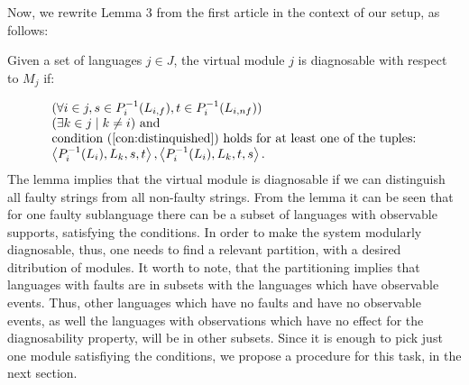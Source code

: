 \documentclass[a4paper, 10pt, conference]{ieeeconf}
\begin{document}
Now, we rewrite Lemma 3 from the first article in the context of our setup, as
follows:
\begin{lemma}
Given a set of languages $j \in J$, the virtual module $j$ is diagnosable with
respect to $M_j$ if:
\end{lemma}
\begin{equation}
	\begin{array}{l}
		(\forall i \in j, 
			s \in P_i^{-1}(L_{i,f}), 
			t \in P_i^{-1}(L_{i,nf}))
		\\
		(\exists k \in j \mid k \neq i) \textrm{ and }
		\\
		\textrm{condition (\ref{con:distinquished}) holds for at least one of
		the tuples:}
		\\
		\left<P_i^{-1}(L_i), L_k, s, t \right>,
		\left<P_i^{-1}(L_i), L_k, t, s \right>.
	\end{array}
\end{equation}
The lemma implies that the virtual module is diagnosable if we can distinguish
all faulty strings from all non-faulty strings. 
From the lemma it can be seen that for one faulty sublanguage there can be a
subset of languages with observable supports, satisfying the conditions. In
order to make the system modularly diagnosable, thus, one needs to find a
relevant partition, with a desired ditribution of modules. It worth to note,
that the partitioning implies that languages with faults are in subsets with the
languages which have observable events. Thus, other languages which have no
faults and have no observable events, as well the languages with observations
which have no effect for the diagnosability property, will be in other subsets.
Since it is enough to pick just one module satisfiying the conditions, we
propose a procedure for this task, in the next section.
\end{document}
